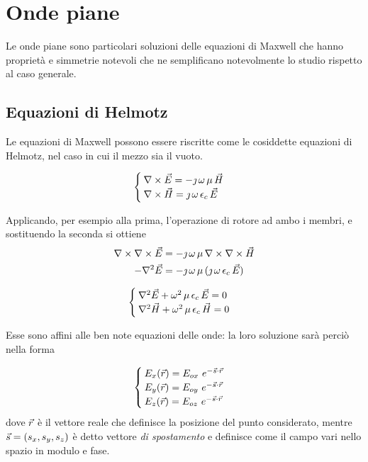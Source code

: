 \chapter{Onde piane}
Le onde piane sono particolari soluzioni delle equazioni di Maxwell che hanno proprietà e simmetrie notevoli che ne semplificano notevolmente lo studio rispetto al caso generale.

\section{Equazioni di Helmotz}
	Le equazioni di Maxwell possono essere riscritte come le cosiddette equazioni di Helmotz, nel caso in cui il mezzo sia il vuoto.

	\begin{equation*}
		\begin{cases}
			\nabla\times\vec{E} = - \jmath \, \omega \, \mu \, \vec{H} \\
			\nabla\times\vec{H} = \jmath \, \omega \, \epsilon_c \, \vec{E} \\
		\end{cases}
	\end{equation*}

	Applicando, per esempio alla prima, l'operazione di rotore ad ambo i membri, e sostituendo la seconda si ottiene
	\begin{equation*}
		\begin{split}
			\nabla\times\nabla\times\vec{E} &= - \jmath \, \omega \, \mu \, \nabla\times \nabla\times\vec{H} \\
			- \nabla^2\vec{E} &= - \jmath \, \omega \, \mu \, (\jmath \, \omega \, \epsilon_c \, \vec{E})\\
		\end{split}
	\end{equation*}

	\begin{equation} \label{eq:helmotz}
		\begin{cases}
			\nabla^2 \vec{E} + \omega^2 \, \mu \, \epsilon_c \, \vec{E} = 0 \\
			\nabla^2 \vec{H} + \omega^2 \, \mu \, \epsilon_c \, \vec{H} = 0
		\end{cases}
	\end{equation}

	Esse sono affini alle ben note equazioni delle onde: la loro soluzione sarà perciò nella forma

	\begin{equation} \label{eq:helmotz_sol}
		\begin{cases}
			E_x(\vec{r}) = E_{ox} ~ e^{-\vec{s} \cdot \vec{r}} \\
			E_y(\vec{r}) = E_{oy} ~ e^{-\vec{s} \cdot \vec{r}} \\
			E_z(\vec{r}) = E_{oz} ~ e^{-\vec{s} \cdot \vec{r}}
		\end{cases}
	\end{equation}
	dove $\vec{r}$ è il vettore reale che definisce la posizione del punto considerato, mentre $\vec{s} = (s_x, s_y, s_z)$ è detto vettore \emph{di spostamento} e definisce come il campo vari nello spazio in modulo e fase.

